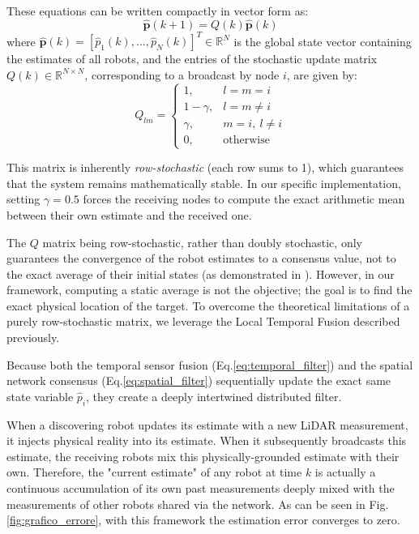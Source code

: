 \documentclass[times, twoside]{zHenriquesLab-StyleBioRxiv}
\begin{document}
These equations can be written compactly in vector form as:
\begin{equation}
    \mathbf{\hat{p}}(k+1) = Q(k)\mathbf{\hat{p}}(k)
\end{equation}
where $\mathbf{\hat{p}}(k) = [\hat{p}_1(k), \dots, \hat{p}_N(k)]^T \in \mathbb{R}^N$ is the global state vector containing the estimates of all robots, and the entries of the stochastic update matrix $Q(k) \in \mathbb{R}^{N \times N}$, corresponding to a broadcast by node $i$, are given by:
\begin{equation}
    Q_{lm} = 
    \begin{cases} 
        1, & l = m = i \\ 
        1 - \gamma, & l = m \neq i \\ 
        \gamma, & m = i, \ l \neq i \\ 
        0, & \text{otherwise} 
    \end{cases}
\end{equation}

This matrix is inherently \textit{row-stochastic} (each row sums to 1), which guarantees that the system remains mathematically stable. In our specific implementation, setting $\gamma = 0.5$ forces the receiving nodes to compute the exact arithmetic mean between their own estimate and the received one.

The $Q$ matrix being row-stochastic, rather than doubly stochastic, only guarantees the convergence of the robot estimates to a consensus value, not to the exact average of their initial states (as demonstrated in \cite{consensusUSATO}). However, in our framework, computing a static average is not the objective; the goal is to find the exact physical location of the target. To overcome the theoretical limitations of a purely row-stochastic matrix, we leverage the Local Temporal Fusion described previously. 

Because both the temporal sensor fusion (Eq.\ref{eq:temporal_filter}) and the spatial network consensus (Eq.\ref{eq:spatial_filter}) sequentially update the exact same state variable $\hat{p}_i$, they create a deeply intertwined distributed filter. 

When a discovering robot updates its estimate with a new LiDAR measurement, it injects physical reality into its estimate. When it subsequently broadcasts this estimate, the receiving robots mix this physically-grounded estimate with their own. Therefore, the "current estimate" of any robot at time $k$ is actually a continuous accumulation of its own past measurements deeply mixed with the measurements of other robots shared via the network. As can be seen in Fig.\ref{fig:grafico_errore}, with this framework the estimation error converges to zero.
\end{document}
